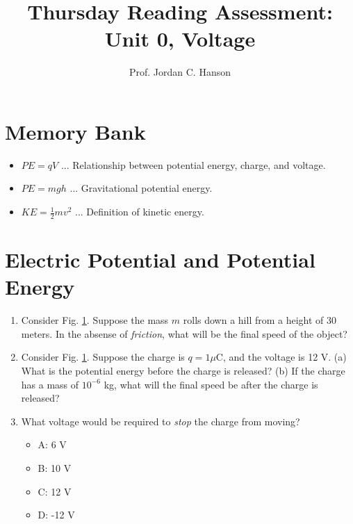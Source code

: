 \documentclass{article}
\begin{document}
\title{Thursday Reading Assessment: Unit 0, Voltage}
\author{Prof. Jordan C. Hanson}

\maketitle

\section{Memory Bank}

\begin{itemize}
\item $PE = q V$ ... Relationship between potential energy, charge, and voltage.
\item $PE = m g h$ ... Gravitational potential energy.
\item $KE = \frac{1}{2}m v^2$ ... Definition of kinetic energy.
\end{itemize}

\section{Electric Potential and Potential Energy}

\begin{enumerate}
\begin{figure}[ht]
\centering
\texttt{[image: hill.png]}
\caption{\label{fig:hill} The relationship between potential energy and voltage.}
\end{figure}
\item Consider Fig. \ref{fig:hill}.  Suppose the mass $m$ rolls down a hill from a height of 30 meters.  In the absense of \textit{friction}, what will be the final speed of the object? \\ \vspace{1cm}
\item Consider Fig. \ref{fig:hill}.  Suppose the charge is $q = 1 \mu$C, and the voltage is 12 V.  (a) What is the potential energy before the charge is released? (b) If the charge has a mass of $10^{-6}$ kg, what will the final speed be after the charge is released? \\ \vspace{1.5cm}
\item What voltage would be required to \textit{stop} the charge from moving?
\begin{itemize}
\item A: 6 V
\item B: 10 V
\item C: 12 V
\item D: -12 V
\end{itemize}
\end{enumerate}
\end{document}
